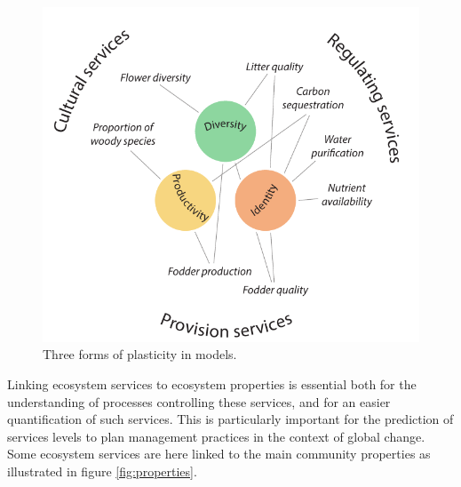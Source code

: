 \begin{figure}
    \includegraphics[width=1\linewidth]{./1_Introduction/graphics/services.pdf}
  \caption[Forms of plasticity in models]{Three forms of plasticity in models. }
  \label{fig:plastic_function}
\end{figure}

Linking ecosystem services to ecosystem properties is essential both for the understanding of processes controlling these services, and for an easier quantification of such services. This is particularly important for the prediction of services levels to plan management practices in the context of global change. Some ecosystem services are here linked to the main community properties as illustrated in figure  \ref{fig:properties}.


